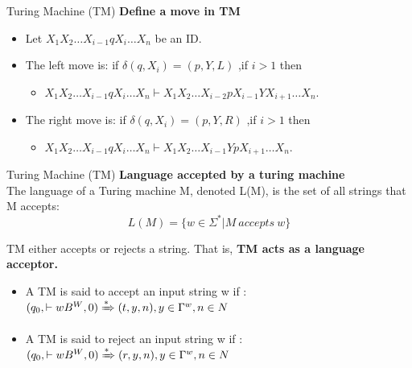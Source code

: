 \documentclass{beamer}
\begin{document}
\begin{frame}{Turing Machine (TM)}
	\textbf{Define a move in TM}
	\begin{itemize}
		\item Let $X_1 X_2…X_{i-1} q X_i…X_n$ be an ID. 
		\item The left move is: if $\delta (q, X_i )= (p, Y,L)$ ,if $i>1$ then
		\begin{itemize}
			\item $X_1 X_2…X_{i-1} q X_i…X_n \vdash X_1X_2… X_{i-2} p X_{i-1} Y X_{i+1}…X_n.$ 
		\end{itemize}
		\item The right move is: if $\delta (q, X_i )= (p, Y,R)$ ,if $i>1$ then
		\begin{itemize}
			\item $X_1 X_2…X_{i-1} q X_i…X_n \vdash X_1X_2… X_{ i-1}Y p X_{i+1}…X_n.$ 
		\end{itemize}
		
	\end{itemize}
\end{frame}	
\begin{frame}{Turing Machine (TM)}
	\textbf{Language accepted by a turing machine}\\
	The language of a Turing machine M, denoted L(M), is 
	the set of all strings that M accepts:
	$$L(M) = \{ w \in \Sigma^* | M\  accepts\  w \}$$
	
	TM either accepts or rejects a string. That is, \textbf{TM acts as a language acceptor.}

	\begin{itemize}
		\item A TM is said to accept an input string w if : $(q_0,\vdash w B^W,0) \xRightarrow *(t,y,n),y\in \Gamma^w,n\in  N$
			\item A TM is said to reject an input string w if : $(q_0,\vdash w B^W,0) \xRightarrow *(r,y,n),y\in \Gamma^w,n\in  N$
	\end{itemize}
\end{frame}	
\end{document}
